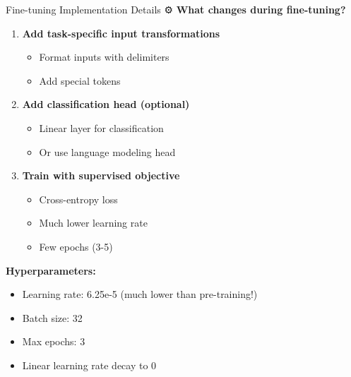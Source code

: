 \documentclass[aspectratio=169]{beamer}
\begin{document}
\begin{frame}[shrink=10]{Fine-tuning Implementation Details ⚙️}
    \textbf{What changes during fine-tuning?}

    \vspace{0.3cm}

    \begin{enumerate}\setlength{\itemsep}{0pt}
        \item \textbf{Add task-specific input transformations}
        \begin{itemize}\setlength{\itemsep}{0pt}
            \item Format inputs with delimiters
            \item Add special tokens
        \end{itemize}

        \vspace{0.3cm}

        \item \textbf{Add classification head (optional)}
        \begin{itemize}\setlength{\itemsep}{0pt}
            \item Linear layer for classification
            \item Or use language modeling head
        \end{itemize}

        \vspace{0.3cm}

        \item \textbf{Train with supervised objective}
        \begin{itemize}\setlength{\itemsep}{0pt}
            \item Cross-entropy loss
            \item Much lower learning rate
            \item Few epochs (3-5)
        \end{itemize}
    \end{enumerate}

    \vspace{0.3cm}

    \textbf{Hyperparameters:}
    \begin{itemize}\setlength{\itemsep}{0pt}
        \item Learning rate: 6.25e-5 (much lower than pre-training!)
        \item Batch size: 32
        \item Max epochs: 3
        \item Linear learning rate decay to 0
    \end{itemize}
\end{frame}
\end{document}

